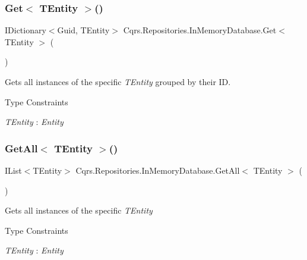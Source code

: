 \subsubsection{\texorpdfstring{Get$<$ T\+Entity $>$()}{Get< TEntity >()}}
{\footnotesize\ttfamily I\+Dictionary$<$Guid, T\+Entity$>$ Cqrs.\+Repositories.\+In\+Memory\+Database.\+Get$<$ T\+Entity $>$ (\begin{DoxyParamCaption}{ }\end{DoxyParamCaption})}



Gets all instances of the specific {\itshape T\+Entity}  grouped by their ID. 

\begin{Desc}
\item[Type Constraints]\begin{description}
\item[{\em T\+Entity} : {\em Entity}]\end{description}
\end{Desc}
\mbox{\label{classCqrs_1_1Repositories_1_1InMemoryDatabase_a83104b325c203f6768bb8ffd2c9c3381_a83104b325c203f6768bb8ffd2c9c3381}} 
\subsubsection{\texorpdfstring{Get\+All$<$ T\+Entity $>$()}{GetAll< TEntity >()}}
{\footnotesize\ttfamily I\+List$<$T\+Entity$>$ Cqrs.\+Repositories.\+In\+Memory\+Database.\+Get\+All$<$ T\+Entity $>$ (\begin{DoxyParamCaption}{ }\end{DoxyParamCaption})}



Gets all instances of the specific {\itshape T\+Entity}  

\begin{Desc}
\item[Type Constraints]\begin{description}
\item[{\em T\+Entity} : {\em Entity}]\end{description}
\end{Desc}
